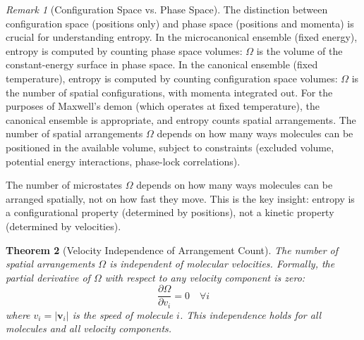 \documentclass[12pt,a4paper]{article}
\newtheorem{theorem}{Theorem}[section]
\theoremstyle{definition}
\theoremstyle{remark}
\newtheorem{remark}[theorem]{Remark}
\begin{document}
\begin{remark}[Configuration Space vs. Phase Space]
\label{rem:configuration_phase}
The distinction between configuration space (positions only) and phase space (positions and momenta) is crucial for understanding entropy. In the microcanonical ensemble (fixed energy), entropy is computed by counting phase space volumes: $\Omega$ is the volume of the constant-energy surface in phase space. In the canonical ensemble (fixed temperature), entropy is computed by counting configuration space volumes: $\Omega$ is the number of spatial configurations, with momenta integrated out. For the purposes of Maxwell's demon (which operates at fixed temperature), the canonical ensemble is appropriate, and entropy counts spatial arrangements. The number of spatial arrangements $\Omega$ depends on how many ways molecules can be positioned in the available volume, subject to constraints (excluded volume, potential energy interactions, phase-lock correlations).
\end{remark}

The number of microstates $\Omega$ depends on how many ways molecules can be arranged spatially, not on how fast they move. This is the key insight: entropy is a configurational property (determined by positions), not a kinetic property (determined by velocities).

\begin{theorem}[Velocity Independence of Arrangement Count]
\label{thm:velocity_arrangement}
The number of spatial arrangements $\Omega$ is independent of molecular velocities. Formally, the partial derivative of $\Omega$ with respect to any velocity component is zero:
\begin{equation}
\frac{\partial \Omega}{\partial v_i} = 0 \quad \forall i
\label{eq:omega_velocity_independent}
\end{equation}
where $v_i = |\mathbf{v}_i|$ is the speed of molecule $i$. This independence holds for all molecules and all velocity components.
\end{theorem}
\end{document}

